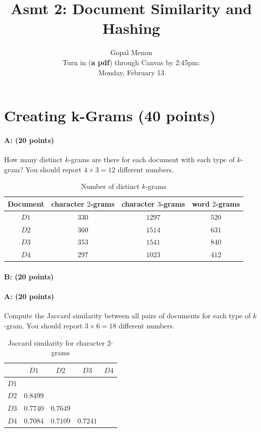 \documentclass[11pt]{article}
\title{Asmt 2: Document Similarity and Hashing}
\author{Gopal Menon\\Turn in (\textbf{a pdf}) through Canvas by 2:45pm: \\
Monday, February 13}
\date{}
\begin{document}
\maketitle



\section{Creating k-Grams (40 points)}

\paragraph{A: (20 points)} 
How many distinct $k$-grams are there for each document with each type of $k$-gram? You
should report $4 \times 3 = 12$ different numbers.

    \begin{table}[!h] 
    \centering
    \caption{Number of distinct $k$-grams}
    \begin{tabular}{|c|c|c|c|}
      \hline
   Document  & character $2$-grams &  character $3$-grams & word $2$-grams  \\
      \hline      
      $D1$ &   $330$              &  $1297$  &          $520$                          \\
      \hline      
      $D2$ &    $360$             & $1514$   &           $631$                         \\
      \hline      
      $D3$ &    $353$           &  $1541$  &             $840$                       \\
      \hline      
      $D4$ &      $297$          &  $1023$  &             $412$                       \\
      \hline
    \end{tabular}
    \end{table}

\paragraph{B: (20 points)}  
\paragraph{A: (20 points)}  
Compute the Jaccard similarity between all pairs of documents for each type of $k$-gram.
You should report $3 \times 6 = 18$ different numbers.

\begin{table}[!ht]  
  \centering
  \caption{Jaccard similarity for character $2$-grams}
  \begin{tabular}{|c|c|c|c|c|}
    \cline{2-5}
    \multicolumn{1}{c|}{} & $D1$ & $D2$ & $D3$ & $D4$\\ \hline
    $D1$ &    &    &   & \\ \hline
    $D2$ & $0.8499$   &    &   & \\ \hline
    $D3$ & $0.7740$   & $0.7649$   &   & \\ \hline
    $D4$ & $0.7084$  & $0.7109$  & $0.7241$ & \\ \hline
  \end{tabular}
  \end{table}
\end{document}
